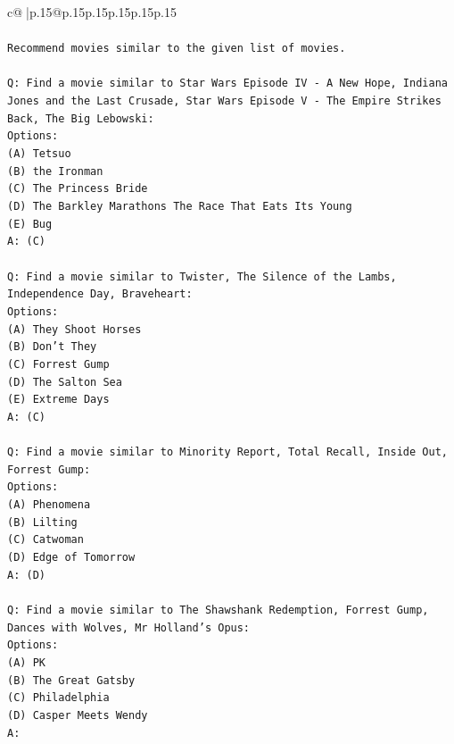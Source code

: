 \documentclass{article}
\begin{document}
{\begin{supertabular}{c@{$\;$}|p{.15\linewidth}@{}p{.15\linewidth}p{.15\linewidth}p{.15\linewidth}p{.15\linewidth}p{.15\linewidth}}
{{{\\ 
\\ 
\texttt{Recommend movies similar to the given list of movies.} \\
\\ 
\texttt{Q: Find a movie similar to Star Wars Episode IV {-} A New Hope, Indiana Jones and the Last Crusade, Star Wars Episode V {-} The Empire Strikes Back, The Big Lebowski:} \\
\texttt{Options:} \\
\texttt{(A) Tetsuo} \\
\texttt{(B) the Ironman} \\
\texttt{(C) The Princess Bride} \\
\texttt{(D) The Barkley Marathons The Race That Eats Its Young} \\
\texttt{(E) Bug} \\
\texttt{A: (C)} \\
\\ 
\texttt{Q: Find a movie similar to Twister, The Silence of the Lambs, Independence Day, Braveheart:} \\
\texttt{Options:} \\
\texttt{(A) They Shoot Horses} \\
\texttt{(B) Don't They} \\
\texttt{(C) Forrest Gump} \\
\texttt{(D) The Salton Sea} \\
\texttt{(E) Extreme Days} \\
\texttt{A: (C)} \\
\\ 
\texttt{Q: Find a movie similar to Minority Report, Total Recall, Inside Out, Forrest Gump:} \\
\texttt{Options:} \\
\texttt{(A) Phenomena} \\
\texttt{(B) Lilting} \\
\texttt{(C) Catwoman} \\
\texttt{(D) Edge of Tomorrow} \\
\texttt{A: (D)} \\
\\ 
\texttt{Q: Find a movie similar to The Shawshank Redemption, Forrest Gump, Dances with Wolves, Mr Holland's Opus:} \\
\texttt{Options:} \\
\texttt{(A) PK} \\
\texttt{(B) The Great Gatsby} \\
\texttt{(C) Philadelphia} \\
\texttt{(D) Casper Meets Wendy} \\
\texttt{A:} \\
            }
        }
    }
     \\ \\


\end{supertabular}}
\end{document}
